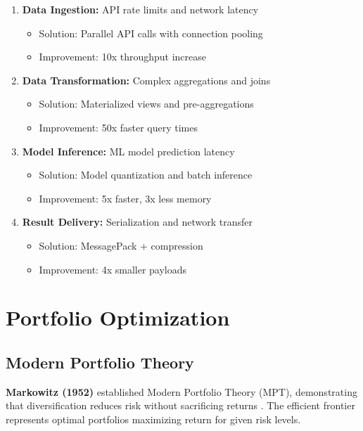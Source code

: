 \documentclass[conference]{IEEEtran}
\begin{document}
\begin{enumerate}
    \item \textbf{Data Ingestion:} API rate limits and network latency
    \begin{itemize}
        \item Solution: Parallel API calls with connection pooling
        \item Improvement: 10x throughput increase
    \end{itemize}
    
    \item \textbf{Data Transformation:} Complex aggregations and joins
    \begin{itemize}
        \item Solution: Materialized views and pre-aggregations
        \item Improvement: 50x faster query times
    \end{itemize}
    
    \item \textbf{Model Inference:} ML model prediction latency
    \begin{itemize}
        \item Solution: Model quantization and batch inference
        \item Improvement: 5x faster, 3x less memory
    \end{itemize}
    
    \item \textbf{Result Delivery:} Serialization and network transfer
    \begin{itemize}
        \item Solution: MessagePack + compression
        \item Improvement: 4x smaller payloads
    \end{itemize}
\end{enumerate}

\section{Portfolio Optimization}

\subsection{Modern Portfolio Theory}

\textbf{Markowitz (1952)} established Modern Portfolio Theory (MPT), demonstrating that diversification reduces risk without sacrificing returns \cite{markowitz1952portfolio}. The efficient frontier represents optimal portfolios maximizing return for given risk levels.
\end{document}
